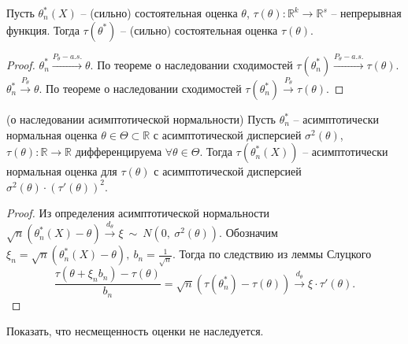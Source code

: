 \begin{proposition}
Пусть $\displaystyle \theta _{n}^{*}( X)$ -- (сильно) состоятельная оценка $\displaystyle \theta $, $\displaystyle \tau ( \theta ) :\mathbb{R}^{k}\rightarrow \mathbb{R}^{s}$ -- непрерывная функция. Тогда $\displaystyle \tau \left( \theta ^{*}\right)$ -- (сильно) состоятельная оценка $\displaystyle \tau ( \theta )$.
\end{proposition}
\begin{proof}
    $\displaystyle \theta _{n}^{*}\xrightarrow{P_{\theta } -a.s.} \theta $. По теореме о наследовании сходимостей $\displaystyle \tau \left( \theta _{n}^{*}\right)\xrightarrow{P_{\theta } -a.s.} \tau ( \theta )$.
    $\displaystyle \theta _{n}^{*}\xrightarrow{P_{\theta }} \theta $. По теореме о наследовании сходимостей $\displaystyle \tau \left( \theta _{n}^{*}\right)\xrightarrow{P_{\theta }} \tau ( \theta )$.
\end{proof}
\begin{lemma}
(о наследовании асимптотической нормальности) Пусть $\displaystyle \theta _{n}^{*}$ -- асимптотически нормальная оценка $\displaystyle \theta \in \Theta \subset \mathbb{R}$ с асимптотической дисперсией $\displaystyle \sigma ^{2}( \theta )$, $\displaystyle \tau ( \theta ) :\mathbb{R}\rightarrow \mathbb{R}$ дифференцируема $\displaystyle \forall \theta \in \Theta $. Тогда $\displaystyle \tau \left( \theta _{n}^{*}( X)\right)$ -- асимптотически нормальная оценка для $\displaystyle \tau ( \theta )$ с асимптотической дисперсией $\displaystyle \sigma ^{2}( \theta ) \cdotp ( \tau '( \theta ))^{2}$.
\end{lemma}
\begin{proof}
    Из определения асимптотической нормальности $\displaystyle \sqrt{n}\left( \theta _{n}^{*}( X) -\theta \right)\xrightarrow{d_{\theta }} \xi \ \sim \ N\left( 0,\ \sigma ^{2}( \theta )\right)$. Обозначим $\displaystyle \xi _{n} =\sqrt{n}\left( \theta _{n}^{*}( X) -\theta \right),\ b_{n} =\frac{1}{\sqrt{n}}$. Тогда по следствию из леммы Слуцкого
    \begin{equation*}
    \frac{\tau ( \theta +\xi _{n} b_{n}) -\tau ( \theta )}{b_{n}} =\sqrt{n}\left( \tau \left( \theta _{n}^{*}\right) -\tau ( \theta )\right)\xrightarrow{d_{\theta }} \xi \cdotp \tau '( \theta ) .
    \end{equation*}
\end{proof}
\begin{exercise}
Показать, что несмещенность оценки не наследуется.
\end{exercise}
